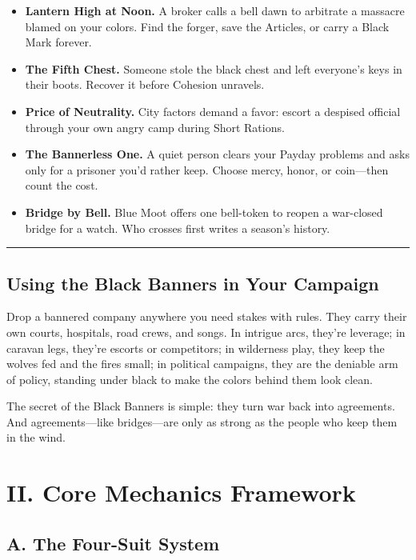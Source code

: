 \documentclass[11pt]{article}
\begin{document}
\begin{itemize}
    \item \textbf{Lantern High at Noon.} A broker calls a bell dawn to arbitrate a massacre blamed on your colors. Find the forger, save the Articles, or carry a Black Mark forever.
    
    \item \textbf{The Fifth Chest.} Someone stole the black chest and left everyone's keys in their boots. Recover it before Cohesion unravels.
    
    \item \textbf{Price of Neutrality.} City factors demand a favor: escort a despised official through your own angry camp during Short Rations.
    
    \item \textbf{The Bannerless One.} A quiet person clears your Payday problems and asks only for a prisoner you'd rather keep. Choose mercy, honor, or coin---then count the cost.
    
    \item \textbf{Bridge by Bell.} Blue Moot offers one bell-token to reopen a war-closed bridge for a watch. Who crosses first writes a season's history.
\end{itemize}

\rule{\textwidth}{0.4pt}

\subsection*{Using the Black Banners in Your Campaign}

Drop a bannered company anywhere you need stakes with rules. They carry their own courts, hospitals, road crews, and songs. In intrigue arcs, they're leverage; in caravan legs, they're escorts or competitors; in wilderness play, they keep the wolves fed and the fires small; in political campaigns, they are the deniable arm of policy, standing under black to make the colors behind them look clean.

The secret of the Black Banners is simple: they turn war back into agreements. And agreements---like bridges---are only as strong as the people who keep them in the wind.

\section*{II. Core Mechanics Framework}

\subsection*{A. The Four-Suit System}
\end{document}
